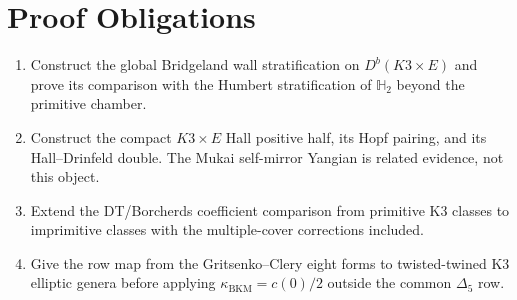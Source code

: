 \documentclass[11pt]{article}
\theoremstyle{definition}
\providecommand{\kBKM}{\kappa_{\mathrm{BKM}}}
\begin{document}
\section{Proof Obligations}
\label{sec:proof-obligations}

\begin{enumerate}
\item Construct the global Bridgeland wall stratification on
$D^b(K3\times E)$ and prove its comparison with the Humbert stratification
of $\mathbb{H}_2$ beyond the primitive chamber.
\item Construct the compact $K3\times E$ Hall positive half, its Hopf
pairing, and its Hall--Drinfeld double. The Mukai self-mirror Yangian
is related evidence, not this object.
\item Extend the DT/Borcherds coefficient comparison from primitive K3
classes to imprimitive classes with the multiple-cover corrections
included.
\item Give the row map from the Gritsenko--Clery eight forms to
twisted-twined K3 elliptic genera before applying
$\kBKM=c(0)/2$ outside the common $\Delta_5$ row.
\end{enumerate}
\end{document}
